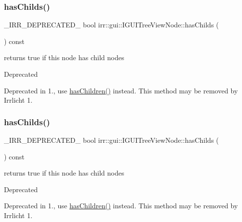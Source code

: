 \subsubsection{\texorpdfstring{has\+Childs()}{hasChilds()}\hspace{0.1cm}{\footnotesize\ttfamily [1/2]}}
{\footnotesize\ttfamily \+\_\+\+I\+R\+R\+\_\+\+D\+E\+P\+R\+E\+C\+A\+T\+E\+D\+\_\+ bool irr\+::gui\+::\+I\+G\+U\+I\+Tree\+View\+Node\+::has\+Childs (\begin{DoxyParamCaption}{ }\end{DoxyParamCaption}) const\hspace{0.3cm}{\ttfamily [inline]}}



returns true if this node has child nodes 

\begin{DoxyRefDesc}{Deprecated}
\item[\hyperlink{deprecated__deprecated000008}{Deprecated}]Deprecated in 1., use \hyperlink{classirr_1_1gui_1_1IGUITreeViewNode_a64244b92443fefbd06c910daf5db3c5f}{has\+Children()} instead. This method may be removed by Irrlicht 1. \end{DoxyRefDesc}
\mbox{\label{classirr_1_1gui_1_1IGUITreeViewNode_a7a771fc86d39a62487184bc56bcf8c52}} 
\subsubsection{\texorpdfstring{has\+Childs()}{hasChilds()}\hspace{0.1cm}{\footnotesize\ttfamily [2/2]}}
{\footnotesize\ttfamily \+\_\+\+I\+R\+R\+\_\+\+D\+E\+P\+R\+E\+C\+A\+T\+E\+D\+\_\+ bool irr\+::gui\+::\+I\+G\+U\+I\+Tree\+View\+Node\+::has\+Childs (\begin{DoxyParamCaption}{ }\end{DoxyParamCaption}) const\hspace{0.3cm}{\ttfamily [inline]}}



returns true if this node has child nodes 

\begin{DoxyRefDesc}{Deprecated}
\item[\hyperlink{deprecated__deprecated000034}{Deprecated}]Deprecated in 1., use \hyperlink{classirr_1_1gui_1_1IGUITreeViewNode_a64244b92443fefbd06c910daf5db3c5f}{has\+Children()} instead. This method may be removed by Irrlicht 1. \end{DoxyRefDesc}
\mbox{\label{classirr_1_1gui_1_1IGUITreeViewNode_abe890d4fde00a4a78fd5f2e39e104338}} 
